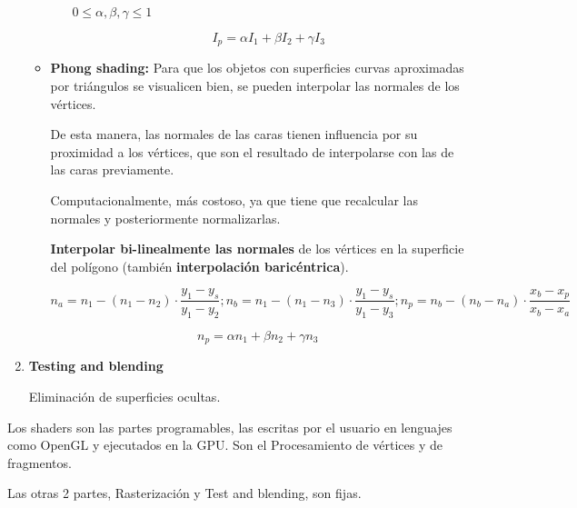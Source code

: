 \begin{enumerate}
\begin{itemize}
\begin{itemize}
            $0\leq \alpha, \beta, \gamma \leq 1$
    
            $$I_p=\alpha I_1 + \beta I_2 + \gamma I_3$$
        \end{itemize}
        \item \textbf{Phong shading:} Para que los objetos con superficies curvas aproximadas por triángulos se visualicen bien, se pueden interpolar las normales de los vértices.
        
        De esta manera, las normales de las caras tienen influencia por su proximidad a los vértices, que son el resultado de interpolarse con las de las caras previamente.

        Computacionalmente, más costoso, ya que tiene que recalcular las normales y posteriormente normalizarlas.

        \textbf{Interpolar bi-linealmente las normales} de los vértices en la superficie del polígono (también \textbf{interpolación baricéntrica}).

        $$n_a =  n_1 - (n_1 - n_2) \cdot \frac{y_1-y_s}{y_1 - y_2};
        n_b =  n_1 - (n_1 - n_3) \cdot \frac{y_1-y_s}{y_1 - y_3};
        n_p =  n_b - (n_b - n_a) \cdot \frac{x_b - x_p}{x_b-x_a}$$

        $$n_p=\alpha n_1 + \beta n_2 + \gamma n_3$$
    \end{itemize}


    \item \textbf{Testing and blending}
    
    Eliminación de superficies ocultas.
\end{enumerate}

Los shaders son las partes programables, las escritas por el usuario en lenguajes como OpenGL y ejecutados en la GPU. Son el Procesamiento de vértices y de fragmentos.

Las otras 2 partes, Rasterización y Test and blending, son fijas.